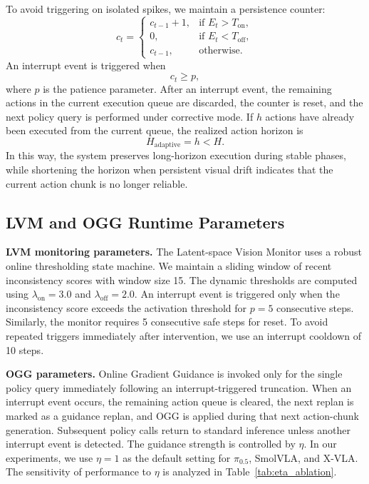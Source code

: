 To avoid triggering on isolated spikes, we maintain a persistence counter:
\begin{equation}
c_t =
\begin{cases}
c_{t-1}+1, & \text{if } E_t>T_{\mathrm{on}},\\
0, & \text{if } E_t<T_{\mathrm{off}},\\
c_{t-1}, & \text{otherwise}.
\end{cases}
\label{eq:debounce_counter_app}
\end{equation}
An interrupt event is triggered when
\begin{equation}
c_t\ge p,
\label{eq:meltdown_trigger_app}
\end{equation}
where $p$ is the patience parameter. After an interrupt event, the remaining actions in the current execution queue are discarded, the counter is reset, and the next policy query is performed under corrective mode. If $h$ actions have already been executed from the current queue, the realized action horizon is
\[
H_{\mathrm{adaptive}}=h<H.
\]
In this way, the system preserves long-horizon execution during stable phases, while shortening the horizon when persistent visual drift indicates that the current action chunk is no longer reliable.

\subsection{LVM and OGG Runtime Parameters}
\label{app:runtime_parameters}

\textbf{LVM monitoring parameters.}
The Latent-space Vision Monitor uses a robust online thresholding state machine. We maintain a sliding window of recent inconsistency scores with window size 15. The dynamic thresholds are computed using $\lambda_{\mathrm{on}}=3.0$ and $\lambda_{\mathrm{off}}=2.0$. An interrupt event is triggered only when the inconsistency score exceeds the activation threshold for $p=5$ consecutive steps. Similarly, the monitor requires 5 consecutive safe steps for reset. To avoid repeated triggers immediately after intervention, we use an interrupt cooldown of 10 steps.

\textbf{OGG parameters.}
Online Gradient Guidance is invoked only for the single policy query immediately following an interrupt-triggered truncation. When an interrupt event occurs, the remaining action queue is cleared, the next replan is marked as a guidance replan, and OGG is applied during that next action-chunk generation. Subsequent policy calls return to standard inference unless another interrupt event is detected. The guidance strength is controlled by $\eta$. In our experiments, we use $\eta=1$ as the default setting for $\pi_{0.5}$, SmolVLA, and X-VLA. The sensitivity of performance to $\eta$ is analyzed in Table~\ref{tab:eta_ablation}.

